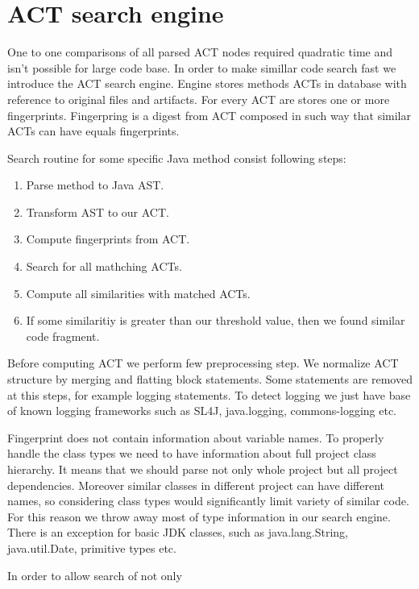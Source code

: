 \section{ACT search engine}

One to one comparisons of all parsed ACT nodes required quadratic time and isn't possible for large code base.
In order to make simillar code search fast we introduce the ACT search engine.
Engine stores methods ACTs in database with reference to original files and artifacts.
For every ACT are stores one or more fingerprints.
Fingerpring is a digest from ACT composed in such way that similar ACTs can have equals fingerprints.

Search routine for some specific Java method consist following steps:
\begin{enumerate} \itemsep0pt \parskip0pt 
  \item Parse method to Java AST.
  \item Transform AST to our ACT.
  \item Compute fingerprints from ACT.
  \item Search for all mathching ACTs.
  \item Compute all similarities with matched ACTs.
  \item If some similaritiy is greater than our threshold value, then we found similar code fragment.
\end{enumerate}

Before computing ACT we perform few preprocessing step.
We normalize ACT structure by merging and flatting block statements.
Some statements are removed at this steps, for example logging statements.
To detect logging we just have base of known logging frameworks such as SL4J, java.logging, commons-logging etc.

Fingerprint does not contain information about variable names.
To properly handle the class types we need to have information about full project class hierarchy.
It means that we should parse not only whole project but all project dependencies.
Moreover similar classes in different project can have different names, so considering class types would significantly limit variety of similar code. For this reason we throw away most of type information in our search engine.
There is an exception for basic JDK classes, such as java.lang.String, java.util.Date, primitive types etc.

In order to allow search of not only

